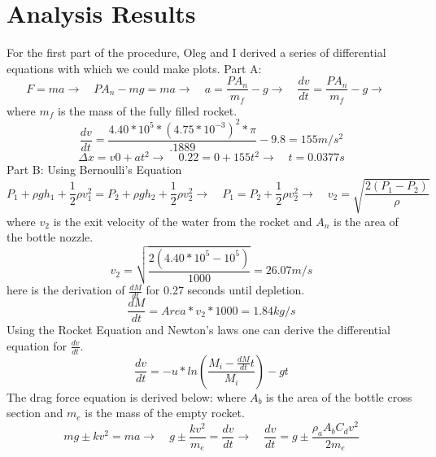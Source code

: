 \documentclass[a4paper,11pt]{article}
\begin{document}
    \section{Analysis Results}
    {}
    {\quad For the first part of the procedure, Oleg and I derived a series of differential equations with which we could make plots.}
    {Part A: }
    \begin{equation} 
        F = ma  \rightarrow \quad PA_{n} - mg = ma \rightarrow \quad a = \frac{PA_{n}}{m_{f}}-g \rightarrow \quad \frac{dv}{dt} = \frac{PA_{n}}{m_{f}}-g \rightarrow \quad 
    \end{equation}
    {where $m_{f}$ is the mass of the fully filled rocket.}
    \begin{equation}   
        \frac{dv}{dt} = \frac{4.40*10^5*(4.75*10^{-3})^{2}*\pi}{.1889}-9.8 = 155 m/s^2
    \end{equation}
    \begin{equation}   
        \Delta x = v0 + at^2 \rightarrow \quad 0.22 = 0 + 155t^2 \rightarrow \quad t = 0.0377s
    \end{equation}
    {Part B: Using Bernoulli's Equation}
    \begin{equation} 
        P_{1} + \rho gh_{1} + \frac{1}{2}\rho v_{1}^2 = P_{2} + \rho gh_{2} + \frac{1}{2}\rho v_{2}^2\rightarrow\quad  P_{1} = P_{2} + \frac{1}{2}\rho v_{2}^2\rightarrow \quad v_{2} = \sqrt{\frac{2(P_{1} - P_{2})}{\rho}}  
    \end{equation}
    {where $v_{2}$ is the exit velocity of the water from the rocket and $A_{n}$ is the area of the bottle nozzle.}
    \begin{equation}
        v_{2} = \sqrt{\frac{2(4.40*10^5- 10^5)}{1000}} = 26.07m/s
    \end{equation}
    {here is the derivation of $\frac{dM}{dt}$ for 0.27 seconds until depletion.}
    \begin{equation}
        \frac{dM}{dt} = Area * v_{2} * 1000 = 1.84 kg/s  
    \end{equation}
    {Using the Rocket Equation and Newton's laws one can derive the differential equation for $\frac{dv}{dt}$.}
    \begin{equation}
        \frac{dv}{dt} = -u*ln(\frac{M_{i}-\frac{dM}{dt}t}{M_{i}}) - gt
    \end{equation}
    {The drag force equation is derived below: where $A_{b}$ is the area of the bottle cross section and $m_{e}$ is the mass of the empty rocket.}
    \begin{equation}
        mg \pm kv^2 = ma \rightarrow \quad g \pm \frac{kv^2}{m_{e}} = \frac{dv}{dt} \rightarrow \quad 
        \frac{dv}{dt} = g \pm \frac{\rho_{a} A_{b}C_{d}v^2}{2m_{e}}
    \end{equation}
    
\end{document}
